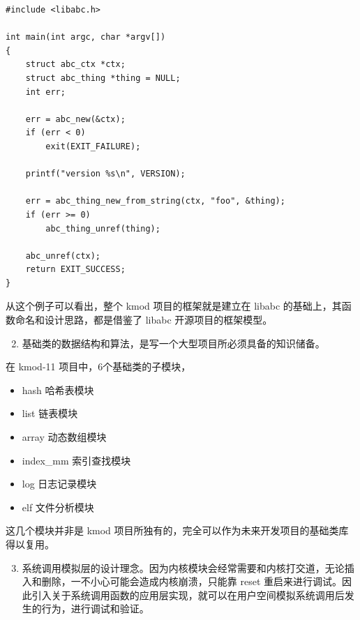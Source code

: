 \documentclass[11pt,a4paper]{article}
\begin{document}
{\begin{shaded}\begin{verbatim}
#include <libabc.h>

int main(int argc, char *argv[])
{
    struct abc_ctx *ctx;
    struct abc_thing *thing = NULL;
    int err;

    err = abc_new(&ctx);
    if (err < 0)
        exit(EXIT_FAILURE);

    printf("version %s\n", VERSION);

    err = abc_thing_new_from_string(ctx, "foo", &thing);
    if (err >= 0)
        abc_thing_unref(thing);

    abc_unref(ctx);
    return EXIT_SUCCESS;
}
\end{verbatim}\end{shaded}}
从这个例子可以看出，整个 kmod 项目的框架就是建立在 libabc
的基础上，其函数命名和设计思路，都是借鉴了 libabc 开源项目的框架模型。

\begin{enumerate}[1)]
\setcounter{enumi}{1}
\item
  基础类的数据结构和算法，是写一个大型项目所必须具备的知识储备。
\end{enumerate}
在 kmod-11 项目中，6个基础类的子模块，

\begin{itemize}
\item
  hash 哈希表模块
\item
  list 链表模块
\item
  array 动态数组模块
\item
  index\_mm 索引查找模块
\item
  log 日志记录模块
\item
  elf 文件分析模块
\end{itemize}
这几个模块并非是 kmod
项目所独有的，完全可以作为未来开发项目的基础类库得以复用。

\begin{enumerate}[1)]
\setcounter{enumi}{2}
\item
  系统调用模拟层的设计理念。因为内核模块会经常需要和内核打交道，无论插入和删除，一不小心可能会造成内核崩溃，只能靠
  reset
  重启来进行调试。因此引入关于系统调用函数的应用层实现，就可以在用户空间模拟系统调用后发生的行为，进行调试和验证。
\end{enumerate}
\end{document}
